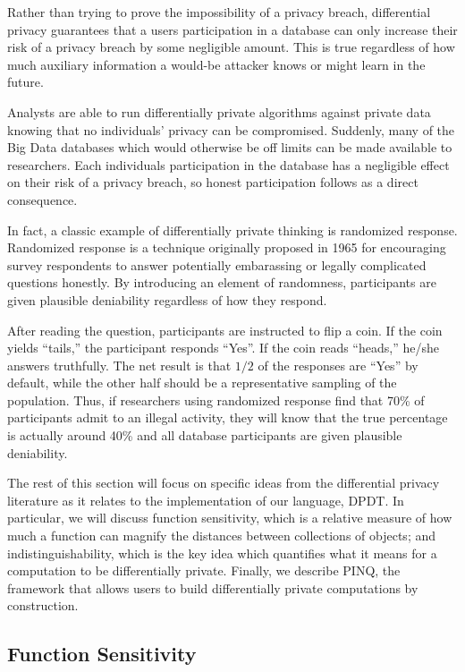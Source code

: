 \documentclass[12pt]{article}
\begin{document}
Rather than trying to prove the impossibility of a privacy breach, differential privacy guarantees that a users participation in a database can only increase their risk of a privacy breach by some negligible amount.
This is true regardless of how much auxiliary information a would-be attacker knows or might learn in the future.

Analysts are able to run differentially private algorithms against private data knowing that no individuals' privacy can be compromised.
Suddenly, many of the Big Data databases which would otherwise be off limits can be made available to researchers.
Each individuals participation in the database has a negligible effect on their risk of a privacy breach, so honest participation follows as a direct consequence.

In fact, a classic example of differentially private thinking is randomized response.
Randomized response is a technique originally proposed in 1965 for encouraging survey respondents to answer potentially embarassing or legally complicated questions honestly\cite{warner1965randomized}.
By introducing an element of randomness, participants are given plausible deniability regardless of how they respond.

After reading the question, participants are instructed to flip a coin.
If the coin yields ``tails,'' the participant responds ``Yes''.
If the coin reads ``heads,'' he/she answers truthfully.
The net result is that $1/2$ of the responses are ``Yes'' by default, while the other half should be a representative sampling of the population.
Thus, if researchers using randomized response find that 70\% of participants admit to an illegal activity, they will know that the true percentage is actually around 40\% and all database participants are given plausible deniability.

The rest of this section will focus on specific ideas from the differential privacy literature as it relates to the implementation of our language, DPDT.
In particular, we will discuss function sensitivity, which is a relative measure of how much a function can magnify the distances between collections of objects; and indistinguishability, which is the key idea which quantifies what it means for a computation to be differentially private.
Finally, we describe PINQ, the framework that allows users to build differentially private computations by construction.

\subsection{Function Sensitivity}\label{subsec:fn_sens}
\end{document}
